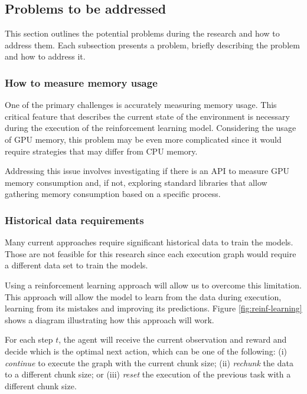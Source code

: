 \subsection{Problems to be addressed}
\label{subsec:problems-to-be-addressed}

This section outlines the potential problems during the research and how to address them.
Each subsection presents a problem, briefly describing the problem and how to address it.

\subsubsection{How to measure memory usage}

One of the primary challenges is accurately measuring memory usage.
This critical feature that describes the current state of the environment is necessary during the execution of the reinforcement learning model.
Considering the usage of \ac{GPU} memory, this problem may be even more complicated since it would require strategies that may differ from \ac{CPU} memory.

Addressing this issue involves investigating if there is an API to measure \ac{GPU} memory consumption and, if not, exploring standard libraries that allow gathering memory consumption based on a specific process.

\subsubsection{Historical data requirements}

Many current approaches require significant historical data to train the models.
Those are not feasible for this research since each execution graph would require a different data set to train the models.

Using a reinforcement learning approach will allow us to overcome this limitation.
This approach will allow the model to learn from the data during execution, learning from its mistakes and improving its predictions.
Figure \ref{fig:reinf-learning} shows a diagram illustrating how this approach will work.

For each step $t$, the agent will receive the current observation and reward and decide which is the optimal next action, which can be one of the following:
(i) \textit{continue} to execute the graph with the current chunk size;
(ii) \textit{rechunk} the data to a different chunk size;
or (iii) \textit{reset} the execution of the previous task with a different chunk size.

